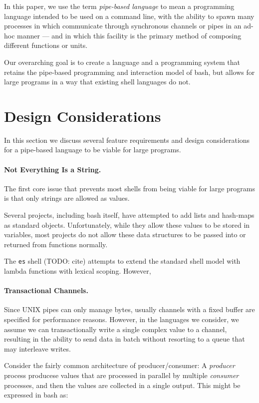 \documentclass[format=sigconf, review=true, draft=true, screen=true]{acmart}
\begin{document}
In this paper, we use the term \emph{pipe-based language} to mean a programming language intended to be used on a command line, with the ability to spawn many processes in which communicate through synchronous channels or pipes in an ad-hoc manner --- and in which this facility is the primary method of composing different functions or units.

Our overarching goal is to create a language and a programming system that retains the pipe-based programming and interaction model of bash, but allows for large programs in a way that existing shell languages do not.

\section{Design Considerations}
In this section we discuss several feature requirements and design considerations for a pipe-based language to be viable for large programs.

\paragraph{Not Everything Is a String.}
The first core issue that prevents most shells from being viable for large programs is that only strings are allowed as values.

Several projects, including bash itself, have attempted to add lists and hash-maps as standard objects. Unfortunately, while they allow these values to be stored in variables, most projects do not allow these data structures to be passed into or returned from functions normally.

The \verb/es/ shell (TODO: cite) attempts to extend the standard shell model with lambda functions with lexical scoping. However, 

\paragraph{Transactional Channels.}
Since UNIX pipes can only manage bytes, usually channels with a fixed buffer are specified for performance reasons. However, in the languages we consider, we assume we can transactionally write a single complex value to a channel, resulting in the ability to send data in batch without resorting to a queue that may interleave writes.

Consider the fairly common architecture of producer/consumer: A \emph{producer} process producese values that are processed in parallel by multiple \emph{consumer} processes, and then the values are collected in a single output. This might be expressed in bash as:
\end{document}
